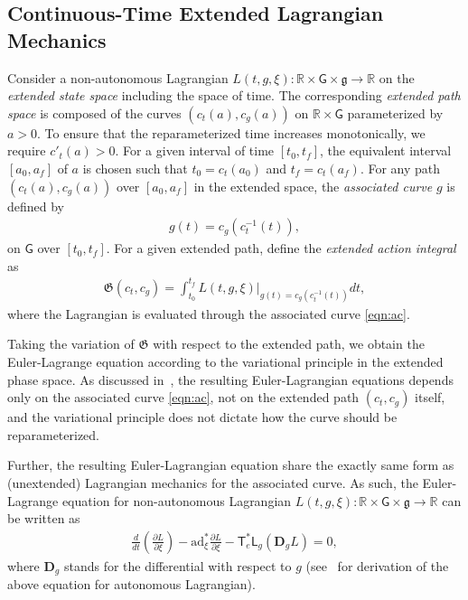 \documentclass[letterpaper, 10pt, conference]{ieeeconf}
\newcommand{\parenth}[1]{\ensuremath{\left( #1 \right)}}
\newcommand{\deriv}[2]{\ensuremath{\frac{\partial #1}{\partial #2}}}
\newcommand{\G}{\ensuremath{\mathsf{G}}}
\newcommand{\T}{\ensuremath{\mathsf{T}}}
\renewcommand{\L}{\ensuremath{\mathsf{L}}}
\renewcommand{\Re}{\ensuremath{\mathbb{R}}}
\newcommand{\D}{\ensuremath{\mathbf{D}}}
\newcommand{\ad}{\ensuremath{\mathrm{ad}}}
\newcommand{\g}{\ensuremath{\mathfrak{g}}}
\begin{document}
\subsection{Continuous-Time Extended Lagrangian Mechanics}


Consider a non-autonomous Lagrangian $L(t,g,\xi):\Re\times\G\times\g\rightarrow \Re$ on the \textit{extended state space} including the space of time.
The corresponding \textit{extended path space} is composed of the curves $(c_t(a),c_g(a))$ on $\Re\times \G$ parameterized by $a>0$.
To ensure that the reparameterized time increases monotonically, we require $c'_t(a) > 0$. 
For a given interval of time $[t_0,t_f]$, the equivalent interval $[a_0,a_f]$ of $a$ is chosen such that $t_0=c_t(a_0)$ and $t_f=c_t(a_f)$.
For any path $(c_t(a),c_g(a))$ over $[a_0,a_f]$ in the extended space, the \textit{associated curve} $g$ is defined by
\begin{align}
    g(t) = c_g(c_t^{-1}(t)),\label{eqn:ac}
\end{align}
on $\G$ over $[t_0,t_f]$.
For a given extended path, define the \textit{extended action integral} as
\begin{align}
    \mathfrak{G}(c_t,c_g) = \int_{t_0}^{t_f} L(t,g,\xi)\bigg|_{g(t) = c_g(c_t^{-1}(t))} dt,\label{eqn:AI}
\end{align}
where the Lagrangian is evaluated through the associated curve \eqref{eqn:ac}.

Taking the variation of $\mathfrak{G}$ with respect to the extended path, we obtain the Euler-Lagrange equation according to the variational principle in the extended phase space. 
As discussed in~\cite[Sec. 4.2.2]{MarWesAN01}, the resulting Euler-Lagrangian equations depends only on the associated curve \eqref{eqn:ac}, not on the extended path $(c_t,c_g)$ itself, and the variational principle does not dictate how the curve should be reparameterized. 

Further, the resulting Euler-Lagrangian equation share the exactly same form as (unextended) Lagrangian mechanics for the associated curve. 
As such, the Euler-Lagrange equation for non-autonomous Lagrangian $L(t,g,\xi):\Re\times\G\times\g\rightarrow \Re$ can be written as
\begin{align}
    \frac{d}{dt}\!\parenth{\deriv{L}{\xi}} - \ad^*_\xi \deriv{L}{\xi} - \T^*_e \L_g (\D_g L) = 0, \label{eqn:EL}
\end{align}
where $\D_g$ stands for the differential with respect to $g$ (see~\cite[Sec. 8.6.3]{LeeLeo17} for derivation of the above equation for autonomous Lagrangian).
\end{document}
